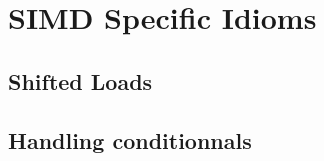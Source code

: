 \section{SIMD Specific Idioms}
\subsection{Shifted Loads}
\frame {}

\subsection{Handling conditionnals}
\frame {}



